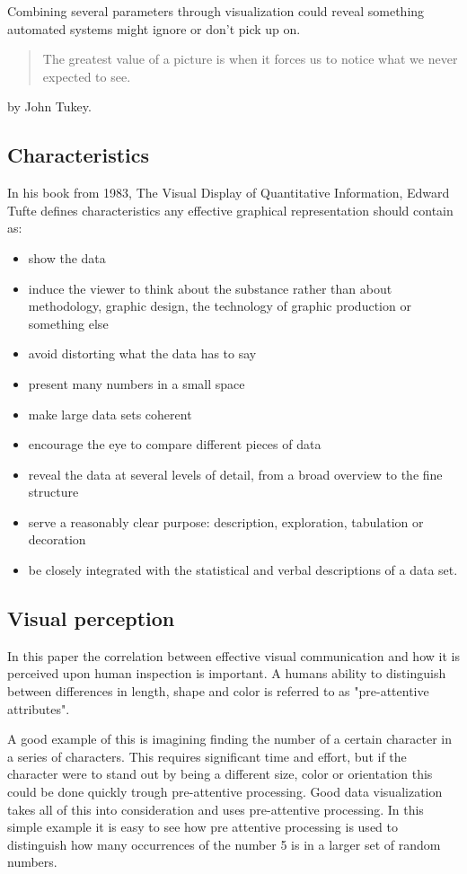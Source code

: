 Combining several parameters through visualization could reveal something automated systems might ignore or don't pick up on. \begin{quotation}
The greatest value of a picture is when it forces us to notice what we never expected to see.
\end{quotation} by John Tukey.

\subsection{Characteristics}
\label{characteristics}
In his book from 1983, The Visual Display of Quantitative Information\cite{tufte}, Edward Tufte defines characteristics any effective graphical representation should contain as:

\begin{itemize}
\item show the data
\item induce the viewer to think about the substance rather than about methodology, graphic design, the technology of graphic production or something else
\item avoid distorting what the data has to say
\item present many numbers in a small space
\item make large data sets coherent
\item encourage the eye to compare different pieces of data
\item reveal the data at several levels of detail, from a broad overview to the fine structure
\item serve a reasonably clear purpose: description, exploration, tabulation or decoration
\item be closely integrated with the statistical and verbal descriptions of a data set.
\end{itemize}

\subsection{Visual perception}
\label{sec:atentive}
In this paper the correlation between effective visual communication and how it is perceived upon human inspection is important. A humans ability to distinguish between differences in length, shape and color is referred to as "pre-attentive attributes".  

A good example of this is imagining finding the number of a certain character in a series of characters. This requires significant time and effort, but if the character were to stand out by being a different size, color or orientation this could be done quickly trough pre-attentive processing. Good data visualization takes all of this into consideration and uses pre-attentive processing. In this simple example it is easy to see how pre attentive processing is used to distinguish how many occurrences of the number 5 is in a larger set of random numbers. 
\newline

